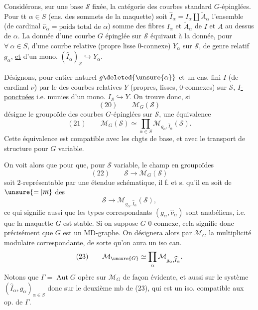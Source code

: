 Considérons, sur une base $\mathcal S$ fixée, la catégorie  des courbes standard $G$-épinglées. Pour tt $\alpha\in S$ (ens. des sommets de la maquette) soit $\widehat I_\alpha=I_\alpha\amalg\widetilde A_\alpha$ l'ensemble (de cardinal $\widehat\nu_\alpha=\text{poids total de }\alpha$) somme
des fibres $I_\alpha$ et $\widetilde A_\alpha$ de $I$ et $A$ au dessus de $\alpha$. La donnée d'une courbe  $G$ épinglée sur $\mathcal S$ équivaut à la donnée,  pour $\forall\ \alpha\in S$, d'une courbe relative (propre lisse  $0$-connexe) $Y_\alpha$ sur $\mathcal S$, de genre relatif $g_\alpha$, \uline{et} d'un mono. $(\widehat I_\alpha)_{\mathcal S}\hookrightarrow Y_\alpha$.

Désignons,  pour  entier naturel $g\deleted{\unsure{\alpha}}$ et un ens. fini $I$ (de cardinal $\nu$) par
le  des courbes relatives $Y$ (propres, lisses, $0$-connexes) sur $\mathcal S$, \uline{$I$-ponctuées} i.e. munies d'un mono. $I_{\mathcal S}\hookrightarrow Y$. On trouve donc, si
\[
(20)\qquad\mathcal M_G(\mathcal S)
\]
désigne le groupoïde des courbes  $G$-épinglées sur $\mathcal S$, une équivalence
\[
(21)\qquad\mathcal M_G(\mathcal S)\simeq\prod_{\alpha\in S}\mathcal M_{g_\alpha,\widehat I_\alpha}(\mathcal S).
\]
Cette équivalence est compatible avec les chgts de base, et avec le transport de structure pour $G$ variable.

On voit alors que pour que, pour $\mathcal S$ variable, le champ en groupoïdes
\[
(22)\qquad\mathcal S\longrightarrow\mathcal M_G(\mathcal S)
\]
soit $2$-représentable par une étendue schématique, il f. et s. qu'il en soit de $\unsure{=|\overline m}$ des
\[
\mathcal S\longrightarrow\mathcal M_{g_\alpha,\widehat I_\alpha}(\mathcal S),
\]
ce qui signifie aussi que les types correspondants $(g_\alpha,\widehat\nu_\alpha)$ sont anabéliens, i.e. que la maquette $G$ est stable. Si on suppose  $G$ $0$-connexe, cela signifie donc précisément que $G$ est un MD-graphe. On désignera alors par $\mathcal M_G$ la multiplicité modulaire
correspondante,  de sorte qu'on aura un iso can.
\[
(23)\qquad\mathcal M_{\unsure{G}}\simeq\prod_\alpha\mathcal M_{g_\alpha,\widehat I_\alpha}.
\]
Notons que $\Gamma=\operatorname{Aut}G$ opère sur $\mathcal M_G$ de façon évidente, et aussi sur le système $(\widehat I_\alpha,g_\alpha)_{\alpha\in S}$ donc sur le deuxième mb de (23), qui est un iso. compatible aux op. de $\Gamma$.

